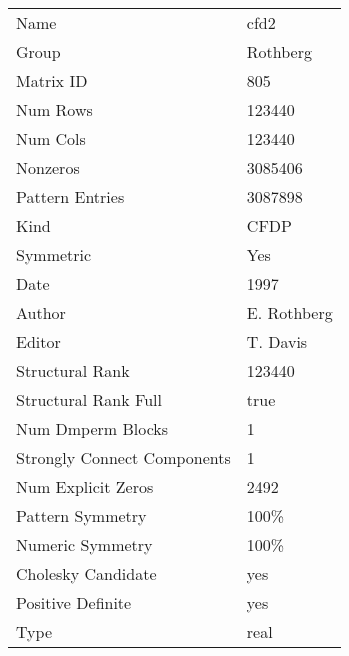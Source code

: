 \begin{tabular}{ll}
\midrule
                       Name &                                 cfd2 \\
                      Group &                             Rothberg \\
                  Matrix ID &                                  805 \\
                   Num Rows &                               123440 \\
                   Num Cols &                               123440 \\
                   Nonzeros &                              3085406 \\
            Pattern Entries &                              3087898 \\
                       Kind & CFDP \\
                  Symmetric &                                  Yes \\
                       Date &                                 1997 \\
                     Author &                          E. Rothberg \\
                     Editor &                             T. Davis \\
            Structural Rank &                               123440 \\
       Structural Rank Full &                                 true \\
          Num Dmperm Blocks &                                    1 \\
Strongly Connect Components &                                    1 \\
         Num Explicit Zeros &                                 2492 \\
           Pattern Symmetry &                                 100\% \\
           Numeric Symmetry &                                 100\% \\
         Cholesky Candidate &                                  yes \\
          Positive Definite &                                  yes \\
                       Type &                                 real \\
\bottomrule
\end{tabular}
